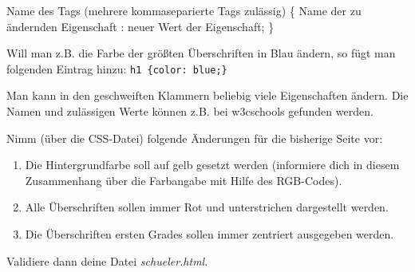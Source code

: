Name des Tags (mehrere kommaseparierte Tags zulässig) \{ Name der zu ändernden Eigenschaft : neuer Wert der Eigenschaft; \}

Will man z.B. die Farbe der größten Überschriften in Blau ändern, so fügt man folgenden Eintrag hinzu: \lstinline|h1 {color: blue;}|

Man kann in den geschweiften Klammern beliebig viele Eigenschaften ändern. Die Namen und zulässigen Werte können z.B. bei w3cschools gefunden werden.

\begin{Exercise}[title=, label=CSS2]
    Nimm (über die CSS-Datei) folgende Änderungen für die bisherige Seite vor:
    \begin{enumerate}
        \item Die Hintergrundfarbe soll auf gelb gesetzt werden (informiere dich in diesem Zusammenhang über die Farbangabe mit Hilfe des RGB-Codes).
        \item Alle Überschriften sollen immer Rot und unterstrichen dargestellt werden.
        \item Die Überschriften ersten Grades sollen immer zentriert ausgegeben werden.
    \end{enumerate}
    Validiere dann deine Datei \textit{schueler.html}.
\end{Exercise}

